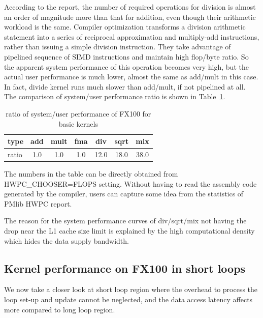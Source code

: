 \documentclass[conference]{IEEEtran}
\begin{document}
According to the report,
the number of required operations for division is almost an order of magnitude
more than that for addition, even though their arithmetic workload
is the same.
Compiler optimization transforms
a division arithmetic statement into a series of reciprocal
approximation and multiply-add instructions, rather than issuing
a simple division instruction. They take advantage of pipelined sequence of
SIMD instructions and maintain high flop/byte ratio.
So the apparent system performance of this operation becomes very high,
but the actual user performance is much lower, almost the same as
add/mult in this case. In fact, divide kernel runs much slower than add/mult,
if not pipelined at all.
The comparison of system/user performance ratio is shown in
Table~\ref{tab:ratio-system-user-fx100}.
\begin{table}[bt]
\centering
\caption{ratio of system/user performance of FX100 for basic kernels}
\label{tab:ratio-system-user-fx100}
\begin{tabular}{l|c|c|c|c|c|c} \hline
type &	add	&	mult &	fma &	div &	sqrt &	mix \\ \hline
ratio &	1.0 &	1.0 &	1.0 &	12.0 &	18.0 &	38.0 \\ \hline 	
\end{tabular}
\end{table}
%
The numbers in the table can be
directly obtained from HWPC\_CHOOSER=FLOPS setting.
Without having to read the assembly code generated by the compiler,
users can capture some idea from the statistics of PMlib HWPC report.

The reason for the system performance curves of div/sqrt/mix
not having the drop near the L1 cache size limit
is explained by the high computational density which hides the
data supply bandwidth.


\subsection{Kernel performance on FX100 in short loops}
\label{subsection:short-kernels-fx100}

We now take a closer look at short loop region where
the overhead to process the loop set-up and update cannot be neglected,
and the data access latency affects more compared to long loop region.
\end{document}
